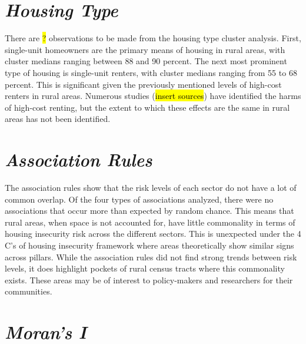 \section{\textit{Housing Type}}

There are \hl{?} observations to be made from the housing type cluster analysis. First, single-unit homeowners are the primary means of housing in rural areas, with cluster medians ranging between 88 and 90 percent. The next most prominent type of housing is single-unit renters, with cluster medians ranging from 55 to 68 percent. This is significant given the previously mentioned levels of high-cost renters in rural areas. Numerous studies (\hl{insert sources}) have identified the harms of high-cost renting, but the extent to which these effects are the same in rural areas has not been identified. 


\section{\textit{Association Rules}}

The association rules show that the risk levels of each sector do not have a lot of common overlap. Of the four types of associations analyzed, there were no associations that occur more than expected by random chance. This means that rural areas, when space is not accounted for, have little commonality in terms of housing insecurity risk across the different sectors. This is unexpected under the 4 C's of housing insecurity framework where areas theoretically show similar signs across pillars. While the association rules did not find strong trends between risk levels, it does highlight pockets of rural census tracts where this commonality exists. These areas may be of interest to policy-makers and researchers for their communities. 

\section{\textit{Moran's I}}

